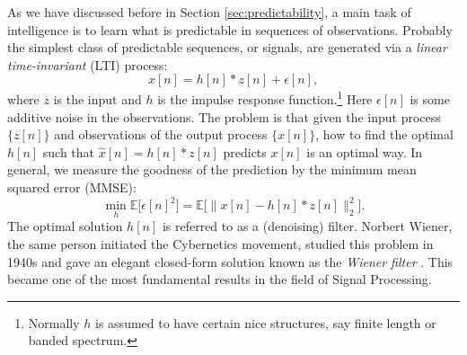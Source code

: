 \documentclass[\toplevelprefix/book-main.tex]{subfiles}
\begin{document}
As we have discussed before in Section \ref{sec:predictability}, a main task of intelligence is to learn what is predictable in sequences of observations. Probably the simplest class  of predictable sequences, or signals, are generated via a {\em linear time-invariant} (LTI) process:
\begin{equation}
    x[n] = h[n]*z[n] + \epsilon[n], 
    \label{eqn:Wiener-model}
\end{equation}
where $z$ is the input and $h$ is the impulse response function.\footnote{Normally $h$ is assumed to have certain nice structures, say finite length or banded spectrum.}  Here $\epsilon[n]$ is some additive noise in the observations. The problem is that given the input process  $\{z[n]\}$ and observations of the output process $\{x[n]\}$, how to find the optimal $h[n]$ such that $\hat x[n] = h[n]*z[n]$ predicts $x[n]$ is an optimal way. In general, we measure the goodness of the prediction by the minimum mean squared error (MMSE):
\begin{equation}
    \min_{h} \mathbb{E} \big[\epsilon[n]^2\big] = \mathbb{E} \big[\|x[n] - h[n]*z[n]\|_2^2\big].
\end{equation}
The optimal solution $h[n]$ is referred to as a (denoising) filter. Norbert Wiener, the same person initiated the Cybernetics movement, studied this problem in 1940s and gave an elegant closed-form  solution known as the {\em Wiener filter} \cite{Wiener-1942,Wiener-1949}. This became one of the most fundamental results in the field of  Signal Processing.
\end{document}
